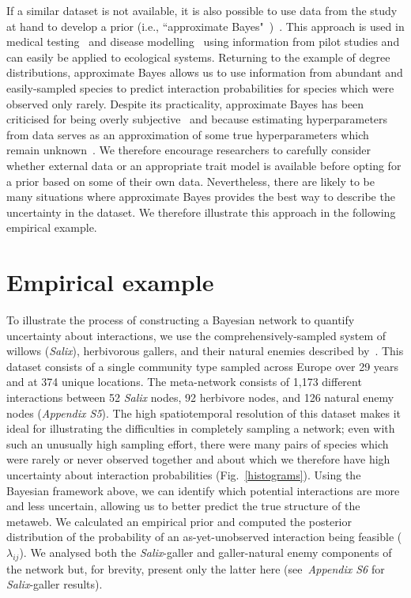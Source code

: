 \documentclass[12pt]{article}
\begin{document}
\begin{spacing}{1.5}
        If a similar dataset is not available, it is also possible to use data from the study at hand to develop a prior (i.e., ``approximate Bayes"~\citet{Gelmanblog})~\citep{Spiegelhalter2000}. This approach is used in medical testing~\citep{Spiegelhalter2000} and disease modelling~\citep{Leyland2005} using information from pilot studies and can easily be applied to ecological systems. Returning to the example of degree distributions, approximate Bayes allows us to use information from abundant and easily-sampled species to predict interaction probabilities for species which were observed only rarely. Despite its practicality, approximate Bayes has been criticised for being overly subjective~\citep{Berger2006} and because estimating hyperparameters from data serves as an approximation of some true hyperparameters which remain unknown~\citep{Gelmanblog}. We therefore encourage researchers to carefully consider whether external data or an appropriate trait model is available before opting for a prior based on some of their own data. Nevertheless, there are likely to be many situations where approximate Bayes provides the best way to describe the uncertainty in the dataset. We therefore illustrate this approach in the following empirical example.


  \section*{Empirical example}

      To illustrate the process of constructing a Bayesian network to quantify uncertainty about interactions, we use the comprehensively-sampled system of willows (\emph{Salix}), herbivorous gallers, and their natural enemies described by~\citet{Kopelke2017}. This dataset consists of a single community type sampled across Europe over 29 years and at 374 unique locations. The meta-network consists of 1,173 different interactions between 52 \emph{Salix} nodes, 92 herbivore nodes, and 126 natural enemy nodes (\emph{Appendix S5}). 
      The high spatiotemporal resolution of this dataset makes it ideal for illustrating the difficulties in completely sampling a network; even with such an unusually high sampling effort, there were many pairs of species which were rarely or never observed together and about which we therefore have high uncertainty about interaction probabilities (Fig.~\ref{histograms}). Using the Bayesian framework above, we can identify which potential interactions are more and less uncertain, allowing us to better predict the true structure of the metaweb. 
      We calculated an empirical prior and computed the posterior distribution of the probability of an as-yet-unobserved interaction being feasible ($\lambda_{ij}$). We analysed both the \emph{Salix}-galler and galler-natural enemy components of the network but, for brevity, present only the latter here (see~\emph{Appendix S6} for \emph{Salix}-galler results).



\end{spacing}
\end{document}

